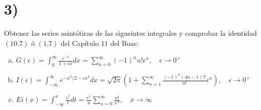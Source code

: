 \documentclass{article}
\begin{document}
\section*{3)}
Obtener las series asintóticas de las sigueintes integrales y comprobar la identidad $(10.7)$ ó $(1.7)$
del Capítulo $11$ del Boas:
\begin{enumerate}[a)]
    \item $G(\epsilon) = \int_0^\infty \frac{e^{-x}}{1+\epsilon x}dx = \sum_{n=0}^\infty (-1)^n n! \epsilon^n, \quad \epsilon \to 0^+$
    \item $I(\epsilon) = \int_{-\infty}^\infty e^{-x^2/2-\epsilon x^4}dx = \sqrt{2\pi} \left( 1 + \sum_{n=1}^\infty \frac{(-1)^n (4n-1)!!}{n!}\epsilon^n \right), \quad \epsilon \to 0^+$
    \item $Ei(x) = \int_{-\infty}^x \frac{e^t}{t}dt = \frac{e^x}{x}\sum_{n=0}^\infty \frac{n!}{x^n}, \quad x \to \infty$
\end{enumerate}
\end{document}

